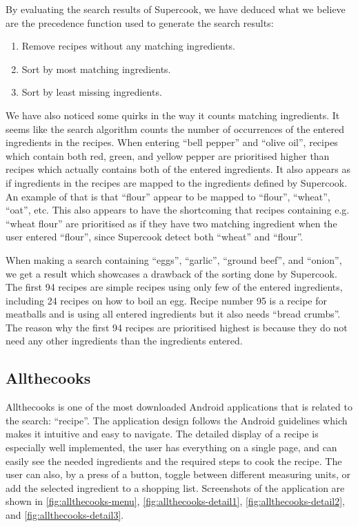 By evaluating the search results of Supercook, we have deduced what we believe are the precedence function used to generate the search results:
\begin{enumerate}
	\item Remove recipes without any matching ingredients.
	\item Sort by most matching ingredients.
	\item Sort by least missing ingredients.
\end{enumerate}
We have also noticed some quirks in the way it counts matching ingredients. It seems like the search algorithm counts the number of occurrences of the entered ingredients in the recipes. When entering ``bell pepper'' and ``olive oil'', recipes which contain both red, green, and yellow pepper are prioritised higher than recipes which actually contains both of the entered ingredients. It also appears as if ingredients in the recipes are mapped to the ingredients defined by Supercook. An example of that is that ``flour'' appear to be mapped to ``flour'', ``wheat'', ``oat'', etc. This also appears to have the shortcoming that recipes containing e.g. ``wheat flour'' are prioritised as if they have two matching ingredient when the user entered ``flour'', since Supercook detect both ``wheat'' and ``flour''.

When making a search containing ``eggs'', ``garlic'', ``ground beef'', and ``onion'', we get a result which showcases a drawback of the sorting done by Supercook. The first 94 recipes are simple recipes using only few of the entered ingredients, including 24 recipes on how to boil an egg. Recipe number 95 is a recipe for meatballs and is using all entered ingredients but it also needs ``bread crumbs''. The reason why the first 94 recipes are prioritised highest is because they do not need any other ingredients than the ingredients entered.

\subsection{Allthecooks}
Allthecooks is one of the most downloaded \cite{allthecooks-googleplay} Android applications that is related to the search: ``recipe''. The application design follows the Android guidelines\cite{guidelines-appstructure} which makes it intuitive and easy to navigate. The detailed display of a recipe is especially well implemented, the user has everything on a single page, and can easily see the needed ingredients and the required steps to cook the recipe. The user can also, by a press of a button, toggle between different measuring units, or add the selected ingredient to a shopping list. Screenshots of the application are shown in \autoref{fig:allthecooks-menu}, \ref{fig:allthecooks-detail1}, \ref{fig:allthecooks-detail2}, and \ref{fig:allthecooks-detail3}.

